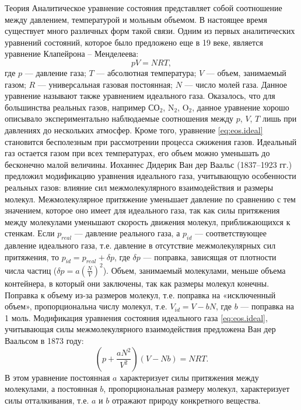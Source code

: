 

Теория
Аналитическое уравнение состояния представляет собой соотношение между давлением, температурой и мольным объемом. В настоящее время существует много различных форм такой связи. Одним из первых аналитических уравнений состояний, которое было предложено еще в 19 веке, является уравнение Клапейрона – Менделеева:
\begin{equation}\label{eq:eos.ideal}
	p V= N R T,
\end{equation}
где $p$ --- давление газа; $T$ --- абсолютная температура; $V$ --- объем, занимаемый газом; $R$ --- универсальная газовая постоянная; $N$ --- число молей газа. Данное уравнение называют также уравнением идеального газа. 
Оказалось, что для большинства реальных газов, например $\mathrm{СО_2}$, $\mathrm{N_2}$, $\mathrm{O_2}$, данное уравнение хорошо описывало экспериментально наблюдаемые соотношения между $p$, $V$, $T$ лишь при давлениях до нескольких атмосфер. Кроме того, уравнение \eqref{eq:eos.ideal} становится бесполезным при рассмотрении процесса сжижения газов. Идеальный газ остается газом при всех температурах, его объем можно уменьшать до бесконечно малой величины. 
Иоханнес Дидерик Ван дер Ваальс (1837–1923 гг.) предложил модификацию уравнения идеального газа, учитывающую особенности реальных газов: влияние сил межмолекулярного взаимодействия и размеры молекул. Межмолекулярное притяжение уменьшает давление по сравнению с тем значением, которое оно имеет для идеального газа, так как силы притяжения между молекулами уменьшают скорость движения молекул, приближающихся к стенкам. Если $p_{real}$ --- давление реального газа, а $p_{id}$ --- соответствующее давление идеального газа, т.е. давление в отсутствие межмолекулярных сил притяжения, то $p_{id}=p_{real}+\delta p$, где $\delta p$ --- поправка, зависящая от плотности числа частиц ($\delta p = a \left(\frac{N}{V} \right)^2$). Объем, занимаемый молекулами, меньше объема контейнера, в который они заключены, так как размеры молекул конечны. Поправка к объему из-за размеров молекул, т.е.  поправка на «исключенный объем», пропорциональна числу молекул, т.е. $V_{id}=V-b N$, где $b$ --- поправка на 1 моль. Модификация уравнения состояния идеального газа \eqref{eq:eos.ideal}, учитывающая силы межмолекулярного взаимодействия предложена Ван дер Ваальсом в 1873 году:
\begin{equation} \label{eq:eos.vdv}
	\left( p+ \dfrac{a N^2}{V^2} \right) (V- Nb) = N R T.
\end{equation}
В этом уравнение постоянная $a$ характеризует силы притяжения между молекулами, а постоянная $b$, пропорциональная размеру молекул, характеризует силы отталкивания, т.е. $a$ и $b$ отражают природу конкретного вещества.


